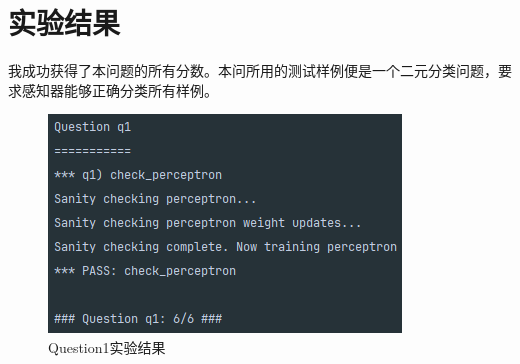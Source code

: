 \section{实验结果}
我成功获得了本问题的所有分数。本问所用的测试样例便是一个二元分类问题，要求感知器能够正确分类所有样例。
\begin{figure}[htbp]
    \centering
    \includegraphics{pic/q1.png}
    \caption{Question1实验结果}\label{q1}
\end{figure}
%
%
